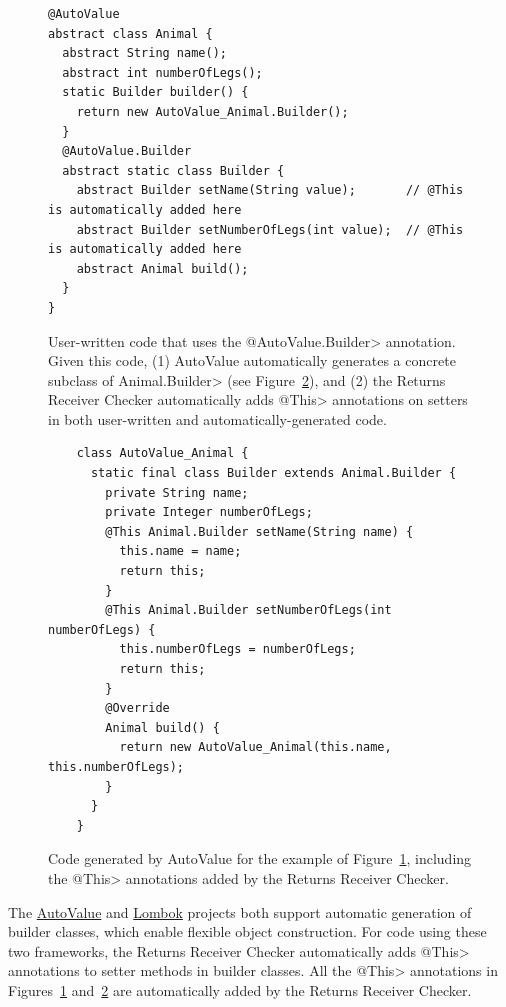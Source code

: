 
\begin{figure}
\begin{Verbatim}
@AutoValue
abstract class Animal {
  abstract String name();
  abstract int numberOfLegs();
  static Builder builder() {
    return new AutoValue_Animal.Builder();
  }
  @AutoValue.Builder
  abstract static class Builder {
    abstract Builder setName(String value);       // @This is automatically added here
    abstract Builder setNumberOfLegs(int value);  // @This is automatically added here
    abstract Animal build();
  }
}
\end{Verbatim}
    \caption{User-written code that uses the \<@AutoValue.Builder> annotation.
      Given this code,
      (1) AutoValue automatically generates a concrete subclass of
      \<Animal.Builder> (see Figure~\ref{fig-autovalue-builder-generated}), and
      (2) the Returns Receiver Checker automatically adds \<@This> annotations
      on setters in both user-written and automatically-generated code.}
    \label{fig-autovalue-builder}
\end{figure}

\begin{figure}
    \begin{Verbatim}
    class AutoValue_Animal {
      static final class Builder extends Animal.Builder {
        private String name;
        private Integer numberOfLegs;
        @This Animal.Builder setName(String name) {
          this.name = name;
          return this;
        }
        @This Animal.Builder setNumberOfLegs(int numberOfLegs) {
          this.numberOfLegs = numberOfLegs;
          return this;
        }
        @Override
        Animal build() {
          return new AutoValue_Animal(this.name, this.numberOfLegs);
        }
      }
    }
    \end{Verbatim}
    \caption{Code generated by AutoValue for the example of
    Figure~\ref{fig-autovalue-builder}, including the \<@This> annotations added
    by the Returns Receiver Checker.}
    \label{fig-autovalue-builder-generated}
\end{figure}

The \href{https://github.com/google/auto/tree/master/value}{AutoValue} and
\href{https://projectlombok.org/}{Lombok} projects both support automatic
generation of builder classes, which enable flexible object construction.
For code using these two frameworks, the Returns Receiver Checker
automatically adds \<@This> annotations to setter methods in builder
classes.  All the \<@This> annotations in
Figures~\ref{fig-autovalue-builder}
and~\ref{fig-autovalue-builder-generated} are automatically added by the
Returns Receiver Checker.

